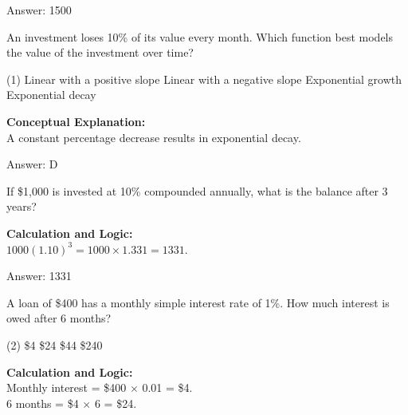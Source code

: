\documentclass[11pt,paper=a4,answers]{exam}
\begin{document}
\begin{questions}
\begin{solution}
\vspace{30pt}

Answer: \colorbox{yellow!100}{1500}
\end{solution}

\vspace{60pt}

\question
An investment loses 10\% of its value every month. Which function best models the value of the investment over time?
\begin{tasks}(1)
    \task Linear with a positive slope
    \task Linear with a negative slope
    \task Exponential growth
    \task Exponential decay
\end{tasks}

\begin{solution}
\textbf{Conceptual Explanation:} \\
A constant percentage decrease results in exponential decay.

\vspace{30pt}

Answer: \colorbox{yellow!100}{D}
\end{solution}

\vspace{60pt}

\question
If \$1,000 is invested at 10\% compounded annually, what is the balance after 3 years?

\begin{solution}
\textbf{Calculation and Logic:} \\
$1000(1.10)^3 = 1000 \times 1.331 = 1331$.

\vspace{30pt}

Answer: \colorbox{yellow!100}{1331}
\end{solution}

\vspace{60pt}

\question
A loan of \$400 has a monthly simple interest rate of 1\%. How much interest is owed after 6 months?
\begin{tasks}(2)
    \task \$4
    \task \$24
    \task \$44
    \task \$240
\end{tasks}

\begin{solution}
\textbf{Calculation and Logic:} \\
Monthly interest = \$400 $\times$ 0.01 = \$4. \\
6 months = \$4 $\times$ 6 = \$24.


\end{solution}
\end{questions}
\end{document}
